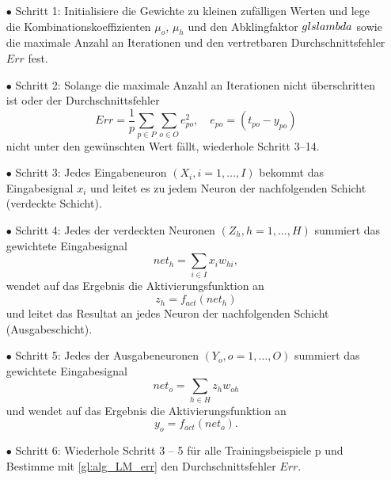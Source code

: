 \begin{itemize}
\item[\textbf{$\bullet$}] Schritt 1: Initialisiere die Gewichte zu kleinen zufälligen Werten und lege die Kombinationskoeffizienten $\mu_o$, $\mu_h$ und den Abklingfaktor $\\gls{lambda}$ sowie die maximale Anzahl an Iterationen und den vertretbaren Durchschnittsfehler $Err$ fest.

\item[\textbf{$\bullet$}] Schritt 2: Solange die maximale Anzahl an Iterationen nicht überschritten ist oder der Durchschnittsfehler
\begin{equation}
Err= \frac{1}{p} \sum\limits_{p \in P} \sum\limits_{o \in O} e_{po}^2, \quad e_{po}=(t_{po}-y_{po})
\label{gl:alg_LM_err}
\end{equation}
nicht unter den gewünschten Wert fällt, wiederhole Schritt 3--14.

\item[\textbf{$\bullet$}] Schritt 3: Jedes Eingabeneuron $(X_{i}, i=1,\dots,I)$ bekommt das Eingabesignal $x_{i}$ und leitet es zu jedem Neuron der nachfolgenden Schicht (verdeckte Schicht).

\item[\textbf{$\bullet$}] Schritt 4: Jedes der verdeckten Neuronen $(Z_{h}, h=1,\dots,H)$ summiert das gewichtete Eingabesignal
\begin{equation}
net_{h}=\sum\limits_{i \in I} x_{i}w_{hi},
\end{equation}
wendet auf das Ergebnis die Aktivierungsfunktion an 
\begin{equation}
z_{h}=f_{act}(net_{h})
\end{equation}
und leitet das Resultat an jedes Neuron der nachfolgenden Schicht (Ausgabeschicht).

\item[\textbf{$\bullet$}] Schritt 5: Jedes der Ausgabeneuronen $(Y_{o}, o=1,\dots,O)$ summiert das gewichtete Eingabesignal 
\begin{equation}
net_{o}=\sum\limits_{h \in H} z_{h}w_{oh}
\end{equation}
und wendet auf das Ergebnis die Aktivierungsfunktion an 
\begin{equation}
y_{o}=f_{act}(net_{o}).
\end{equation}

\item[\textbf{$\bullet$}] Schritt 6: Wiederhole Schritt 3 -- 5 für alle Trainingsbeispiele p und Bestimme mit \autoref{gl:alg_LM_err} den Durchschnittsfehler $Err$.


\end{itemize}
